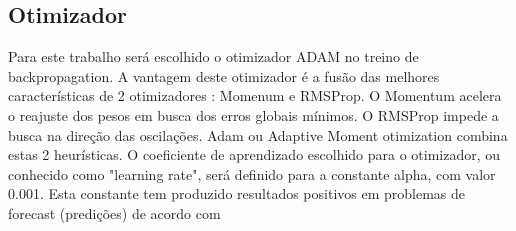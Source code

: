 \documentclass[	12pt, Times, openright, twoside, a4paper, english, brazil]{abntex2}
\begin{document}
    \subsection{Otimizador}
        \begin{figure}[H]
        	 \label{fig:otimizadores}
        \end{figure}
        Para este trabalho será escolhido o otimizador ADAM no treino de backpropagation.
        A vantagem deste otimizador é a fusão das melhores características de 2 otimizadores :\newline 
         Momenum e RMSProp. \newline
        O Momentum acelera o reajuste dos pesos em busca dos erros globais mínimos.\newline
         O RMSProp impede a busca na direção das oscilações.\newline
         Adam ou Adaptive Moment otimization combina estas 2 heurísticas.
        O coeficiente de aprendizado escolhido para o otimizador, ou conhecido como "learning rate", será definido para a constante alpha, com valor 0.001.
        Esta constante tem produzido resultados positivos em problemas de forecast (predições) de acordo com \cite{MLM}
\end{document}
